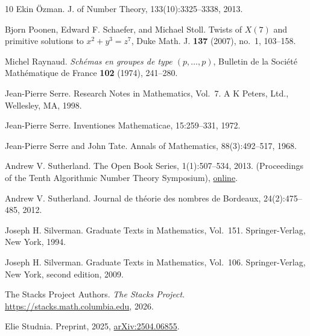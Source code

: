 \documentclass[12pt]{amsart}
\numberwithin{equation}{section}
\theoremstyle{definition}
\begin{document}
\begin{thebibliography}{10}
Ekin \"Ozman.
\newblock J. of Number Theory, 133(10):3325--3338, 2013.

Bjorn Poonen, Edward F. Schaefer, and Michael Stoll.
\newblock Twists of $X(7)$ and primitive solutions to $x^2+y^3=z^7$,
\newblock Duke Math. J. \textbf{137} (2007), no.~1, 103--158.

Michel Raynaud.
\emph{Sch\'emas en groupes de type $(p,\ldots,p)$},
Bulletin de la Soci\'et\'e Math\'ematique de France
\textbf{102} (1974), 241--280.

Jean-Pierre Serre.
\newblock Research Notes in Mathematics, Vol.~7. A K Peters, Ltd., Wellesley, MA, 1998.

Jean-Pierre Serre.
\newblock Inventiones Mathematicae, 15:259--331, 1972.

Jean-Pierre Serre and John Tate.
\newblock Annals of Mathematics, 88(3):492--517, 1968.

Andrew V. Sutherland.
\newblock The Open Book Series, 1(1):507--534, 2013.
\newblock (Proceedings of the Tenth Algorithmic Number Theory Symposium),
\newblock \href{https://msp.org/obs/2013/1-1/obs-v1-n1-p25-s.pdf}{online}.

Andrew V. Sutherland.
\newblock Journal de th\'eorie des nombres de Bordeaux, 24(2):475--485, 2012.

Joseph H. Silverman.
\newblock Graduate Texts in Mathematics, Vol.~151. Springer-Verlag, New York, 1994.

Joseph H. Silverman.
\newblock Graduate Texts in Mathematics, Vol.~106. Springer-Verlag, New York, second edition, 2009.

The Stacks Project Authors.
\newblock \emph{The Stacks Project}.
\newblock \url{https://stacks.math.columbia.edu}, 2026.

Elie Studnia.
\newblock Preprint, 2025, \href{https://arxiv.org/abs/2504.06855}{arXiv:2504.06855}.


\end{thebibliography}
\end{document}
